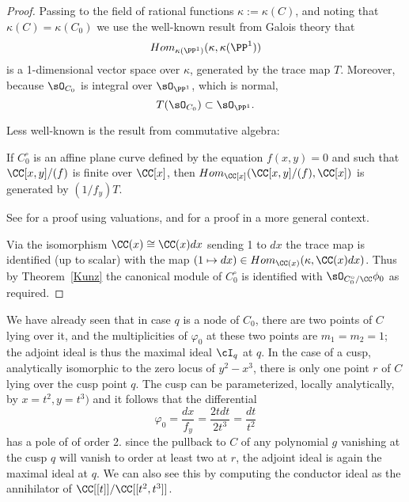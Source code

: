 \begin{proof}
Passing to the field of rational functions $\kappa := \kappa(C)$, and noting that
$\kappa(C) = \kappa(C_{0}) $ we use the well-known result from Galois theory that 
$$
Hom_{\kappa(\PP^{1})}(\kappa, \kappa(\PP^{1}))
$$
is a 1-dimensional vector space over $\kappa$, generated by the trace map $T$. Moreover, 
because $\sO_{C_{0}}$ is integral over $\sO_{\PP^{1}}$, which is normal,
$$
T(\sO_{C_{0}})\subset \sO_{\PP^{1}}.
$$

Less well-known is the result from commutative
algebra:
\begin{fact}
\begin{theorem}\label{Kunz}
If $C_{0}^{\circ}$ is an affine plane curve defined by the
equation $f(x,y)=0$ and such that $\CC[x,y]/(f)$ is finite over $\CC[x]$,
then $Hom_{\CC[x]}(\CC[x,y]/(f), \CC[x])$ is generated by $(1/f_{y})T$.
\end{theorem}
See \cite[Theorem 15.1]{Kunz} for a proof using valuations, and \cite[Theorem A.1]{MR4026452} for a proof in
a more general context.
\end{fact}

Via the isomorphism $\CC(x) \cong \CC(x)dx$ sending 1 to $dx$ the trace map is identified (up to scalar)
with the map $(1\mapsto dx) \in Hom_{\CC(x)}(\kappa, \CC(x)dx)$. Thus by Theorem~\ref{Kunz}
the canonical module of $C_{0}^{\circ}$ is identified with $\sO_{C_{0}^{\circ}/\CC} \phi_{0}$ as
required.
\end{proof}




\begin{example}
We have already seen that in case $q$ is a node of $C_0$, there are two points of $C$ lying over it, and the multiplicities of $\varphi_0$ at these two points are $m_1=m_2=1$; the adjoint ideal is thus 
 the maximal ideal $\cI_q$ at $q$. In the case of a cusp, analytically isomorphic to the zero locus of $y^2-x^3$, there is only one point $r$ of $C$ lying over the cusp point $q$. The cusp can be parameterized, locally analytically,
 by $x = t^{2}, y = t^{3})$ and it follows that the differential 
 $$
 \varphi_0 = \frac{dx}{f_{y}} =  \frac{2tdt}{2t^{3}} =  \frac{dt}{t^{2}}
 $$ 
 has a pole of of order 2. since the pullback to $C$ of any polynomial $g$ vanishing at the cusp $q$ will vanish to order at least two at $r$, the adjoint ideal is again the maximal ideal at $q$. We can also see this by computing the
 conductor ideal as the annihilator of $\CC[[t]]/\CC[[t^{2}, t^{3}]]$.
\end{example}

